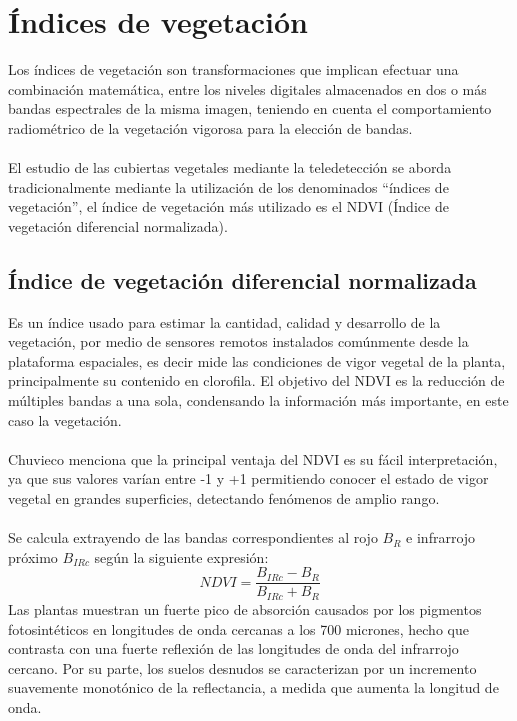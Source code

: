  
\section{\'Indices de vegetaci\'on}
Los \'indices de vegetaci\'on son transformaciones que implican efectuar una combinaci\'on matem\'atica, entre los niveles digitales almacenados en dos o m\'as bandas espectrales de la misma imagen, teniendo en cuenta el comportamiento radiom\'etrico de la vegetaci\'on vigorosa para la elecci\'on de bandas\cite{speranza2005potencialidad}. \\~\\
El estudio de las cubiertas vegetales mediante la teledetecci\'on se aborda tradicionalmente mediante la utilización de los denominados “índices de vegetaci\'on”, el índice de vegetaci\'on m\'as utilizado es el NDVI (\'Indice de vegetaci\'on diferencial normalizada)\cite{sader2000estimacion}.

\subsection{\'Indice de vegetaci\'on diferencial normalizada}\label{subsec:ndvi}
Es un \'indice usado para estimar la cantidad, calidad y desarrollo de la vegetaci\'on, por medio de sensores remotos instalados com\'unmente desde la plataforma espaciales, es decir mide las condiciones de vigor vegetal de la planta, principalmente su contenido en clorofila\cite{salinero2002teledeteccion}. El objetivo del NDVI es la reducci\'on de m\'ultiples bandas a una sola, condensando la informaci\'on m\'as importante, en este caso la vegetaci\'on.\\~\\
Chuvieco\cite{salinero2002teledeteccion} menciona que la principal ventaja del NDVI es su f\'acil interpretaci\'on, ya que sus
valores var\'ian entre -1 y +1 permitiendo conocer el estado de vigor vegetal en grandes superficies, detectando fen\'omenos de amplio rango.\\~\\
Se calcula extrayendo de las bandas correspondientes al rojo $B_{R}$ e infrarrojo pr\'oximo $B_{IRc}$ seg\'un la siguiente expresi\'on:
	\begin{equation}
	\label{e:ndvi}
	NDVI=\dfrac{B_{IRc}-B_{R}}{B_{IRc}+B_{R}}
	\end{equation}
Las plantas muestran un fuerte pico de absorci\'on causados por los pigmentos fotosint\'eticos en longitudes de onda cercanas a los 700 micrones, hecho que contrasta con una fuerte reflexi\'on de las longitudes de onda del infrarrojo cercano. Por su parte, los suelos desnudos se caracterizan por un incremento suavemente monot\'onico de la reflectancia, a medida que aumenta la longitud de onda.

